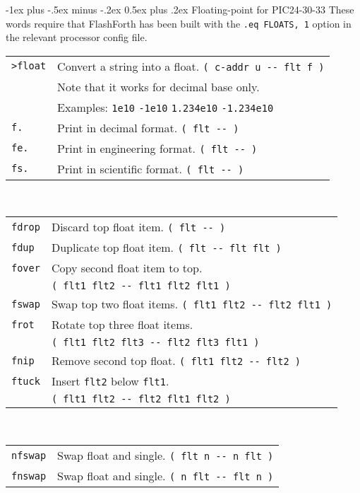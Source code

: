 \documentclass[10pt,landscape,a4paper]{article}
\makeatletter
\renewcommand{\section}{\@startsection{section}{1}{0mm}%
                                {-1ex plus -.5ex minus -.2ex}%
                                {0.5ex plus .2ex}%
                                {\normalfont\large\bfseries}}
\makeatother
\begin{document}
\begin{multicols}{3}
\bigskip

\section{Floating-point for PIC24-30-33}
These words require that FlashForth has been built with the \verb!.eq FLOATS, 1! option
in the relevant processor config file.\\
\begin{tabular}{@{}ll@{}}
\verb!>float! & Convert a string into a float. \verb!( c-addr u -- flt f )! \\
              & Note that it works for decimal base only. \\
              & Examples: \verb!1e10! \verb!-1e10! \verb!1.234e10! \verb!-1.234e10! \\
\verb!f.! & Print in decimal format. \verb!( flt -- )! \\
\verb!fe.! & Print in engineering format. \verb!( flt -- )! \\
\verb!fs.! & Print in scientific format. \verb!( flt -- )! \\
\end{tabular}\\
\begin{tabular}{@{}ll@{}}
\verb!fdrop! & Discard top float item. \verb!( flt -- )! \\
\verb!fdup! & Duplicate top float item. \verb!( flt -- flt flt )! \\
\verb!fover! & Copy second float item to top. \\
             & \verb!( flt1 flt2 -- flt1 flt2 flt1 )! \\
\verb!fswap! & Swap top two float items. \verb!( flt1 flt2 -- flt2 flt1 )! \\
\verb!frot! & Rotate top three float items. \\
            & \verb!( flt1 flt2 flt3 -- flt2 flt3 flt1 )! \\
\verb!fnip! & Remove second top float. \verb!( flt1 flt2 -- flt2 )! \\
\verb!ftuck! & Insert \verb!flt2! below \verb!flt1!. \\
             & \verb!( flt1 flt2 -- flt2 flt1 flt2 )! \\
\end{tabular}\\
\begin{tabular}{@{}ll@{}}
\verb!nfswap! & Swap float and single. \verb!( flt n -- n flt )! \\
\verb!fnswap! & Swap float and single. \verb!( n flt -- flt n )! \\

\end{tabular}
\end{multicols}
\end{document}
